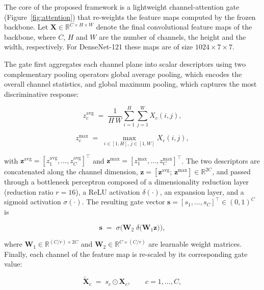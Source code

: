 \documentclass[a4paper,fleqn]{cas-dc}
\begin{document}
The core of the proposed framework is a lightweight channel-attention gate
(Figure~\ref{fig:attention}) that re-weights the feature maps computed by the
frozen backbone. Let
$\mathbf{X}\in\mathbb{R}^{C\times H \times W}$ denote the final convolutional
feature maps of the backbone, where $C$, $H$ and $W$ are the number of
channels, the height and the width, respectively. For DenseNet-121 these maps
are of size $1024\times7\times7$.

The gate first aggregates each channel plane into scalar descriptors using
two complementary pooling operators global average pooling, which encodes
the overall channel statistics, and global maximum pooling, which captures
the most discriminative response:

\begin{equation}\label{eq:gap}
  z^{\text{avg}}_c \;=\;
  \frac{1}{H\, W} \sum_{i=1}^{H}\sum_{j=1}^{W} X_c(i,j),
\end{equation}

\begin{equation}\label{eq:gmp}
  z^{\text{max}}_c \;=\;
  \max_{i\in[1,H],\, j\in[1,W]} X_c(i,j),
\end{equation}

with $\mathbf{z}^{\text{avg}}=[z^{\text{avg}}_1,\dots,z^{\text{avg}}_C]^\top$
and $\mathbf{z}^{\text{max}}=[z^{\text{max}}_1,\dots,z^{\text{max}}_C]^\top$.
The two descriptors are concatenated along the channel dimension,
$\mathbf{z}=[\mathbf{z}^{\text{avg}};\,\mathbf{z}^{\text{max}}]\in\mathbb{R}^{2C}$,
and passed through a bottleneck perceptron composed of a dimensionality
reduction layer (reduction ratio $r=16$), a ReLU activation
$\delta(\cdot)$, an expansion layer, and a sigmoid activation
$\sigma(\cdot)$. The resulting gate vector
$\mathbf{s}=[s_1,\dots,s_C]^\top\in(0,1)^C$ is

\begin{equation}\label{eq:attweights}
  \mathbf{s} \;=\;
  \sigma\!\Big(
    \mathbf{W}_2\; \delta\!\big( \mathbf{W}_1 \mathbf{z} \big)
  \Big),
\end{equation}

where $\mathbf{W}_1 \in \mathbb{R}^{(C/r)\times 2C}$ and
$\mathbf{W}_2 \in \mathbb{R}^{C \times (C/r)}$ are learnable weight matrices.
Finally, each channel of the feature map is re-scaled by its corresponding
gate value:

\begin{equation}\label{eq:recalib}
  \widetilde{\mathbf{X}}_c \;=\; s_c \odot \mathbf{X}_c,
\qquad c = 1,\dots,C,
\end{equation}
\end{document}
